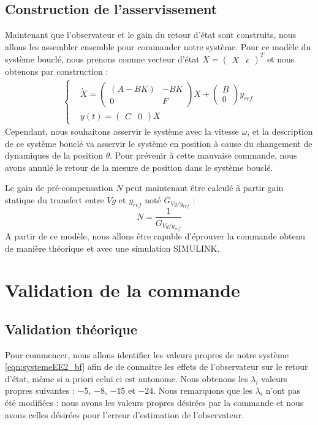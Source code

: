 \subsection{Construction de l'asservissement}
Maintenant que l'observateur et le gain du retour d'état sont construits, nous allons les assembler ensemble pour commander notre système. Pour ce modèle du système bouclé, nous prenons comme vecteur d'état $X=\begin{pmatrix}
X&\epsilon
\end{pmatrix}^T$ et nous obtenons par construction :
\begin{align*}
\label{eqn:systemeEE2_bf}
\left\lbrace
\begin{aligned}
& \dot{X} = \begin{pmatrix}
(A-BK) & -BK\\
0& F
\end{pmatrix}X+\begin{pmatrix}
B\\0
\end{pmatrix}y_{ref} \\
& y(t) = \begin{pmatrix}
C & 0
\end{pmatrix}X
\end{aligned}
\right.
\end{align*} 
Cependant, nous souhaitons asservir le système avec la vitesse $\omega$, et la description de ce système bouclé va asservir le système en position à cause du changement de dynamiques de la position $\theta$. Pour prévenir à cette mauvaise commande, nous avons annulé le retour de la mesure de position dans le système bouclé. 

Le gain de pré-compensation $N$ peut maintenant être calculé à partir gain statique du transfert entre $Vg$ et $y_{ref}$ noté $G_{Vg/y_{ref}}$ : 
\begin{equation}
N = \frac{1}{G_{Vg/y_{ref}}}
\end{equation}
A partir de ce modèle, nous allons être capable d'éprouver la commande obtenu de manière théorique et avec une simulation SIMULINK.

\section{Validation de la commande}
\subsection{Validation théorique}
Pour commencer, nous allons identifier les valeurs propres de notre système \ref{eqn:systemeEE2_bf} afin de de connaitre les effets de l'observateur sur le retour d'état, même si a priori celui ci est autonome. Nous obtenons les $\lambda_i$ valeurs propres suivantes : $-5$, $-8$, $-15$ et $-24$. Nous remarquons que les $\lambda_i$ n'ont pas été modifiées : nous avons les valeurs propres désirées par la commande et nous avons celles désirées pour l'erreur d'estimation de l'observateur. 


